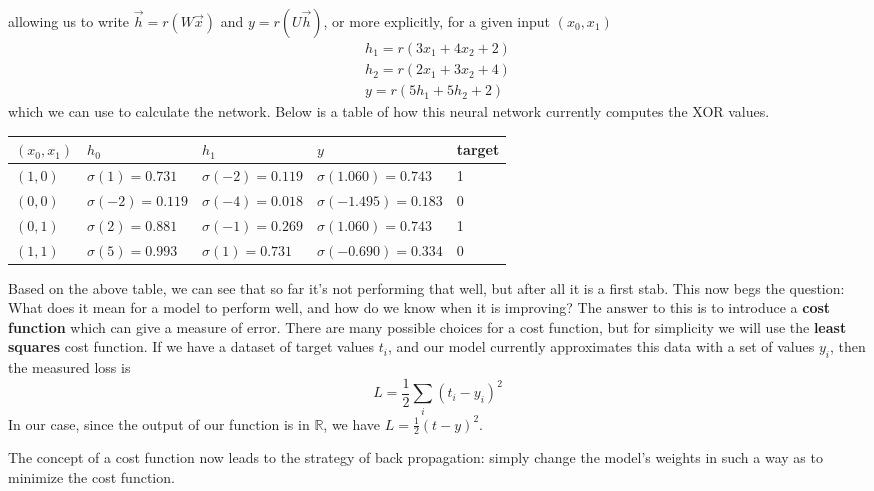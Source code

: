 \documentclass[12pt,letterpaper]{book}
\theoremstyle{definition}
\begin{document}
  allowing us to write $\vec{h} = r(W\vec{x})$ and $y = r(U\vec{h})$, 
  or more explicitly, for a given input $(x_0, x_1)$
  \begin{align}
    h_1 = r(3x_1 + 4x_2 + 2)\\
    h_2 = r(2x_1 + 3x_2 + 4)\\
    y = r(5h_1 + 5h_2 + 2)
  \end{align}
  which we can use to calculate the network.
  Below is a table of how this neural network currently computes the XOR values.
  \begin{center}
    \begin{tabular}{ |p{1.5cm}||p{3cm}|p{3cm}|p{3.5cm}|p{1.5cm}| }
      \hline
      $(x_0, x_1)$ & $h_0$ & $h_1$ & $y$ & target\\
      \hline
      $(1, 0)$ & $\sigma(1) = 0.731$ & $\sigma(-2) = 0.119$ & $\sigma(1.060) = 0.743$ & 1 \\
      \hline
      $(0, 0)$ & $\sigma(-2) = 0.119$ & $\sigma(-4) = 0.018$ & $\sigma(-1.495) = 0.183$  & 0\\
      \hline
      $(0, 1)$ & $\sigma(2) = 0.881$ & $\sigma(-1) = 0.269$ & $\sigma(1.060) = 0.743$ & 1 \\
      \hline
      $(1, 1)$ & $\sigma(5) = 0.993$ & $\sigma(1) = 0.731$ & $\sigma(-0.690) = 0.334$ & 0\\
      \hline
     \end{tabular}
     
  \end{center}
  Based on the above table, we can see that so far it's not performing that well, but after 
  all it is a first stab. This now begs the question: What does it 
  mean for a model to perform well, and how do we know when it is improving? The answer
  to this is to introduce a \textbf{cost function} which can give a measure of error. There are 
  many possible choices for a cost function, but for simplicity we will use the \textbf{least squares}
  cost function. If we have a dataset of target values $t_i$, and our model currently 
  approximates this data with a set of values $y_i$, then the measured loss is 
  \[
      L = \frac{1}{2}\sum_{i}(t_i - y_i)^2
  \] 
  In our case, since the output of our function is in $\mathbb{R}$, we have 
  $L = \frac{1}{2}(t - y)^2$. 

  The concept of a cost function now leads to the strategy of back propagation: simply change the 
  model's weights in such a way as to minimize the cost function.
\end{document}
